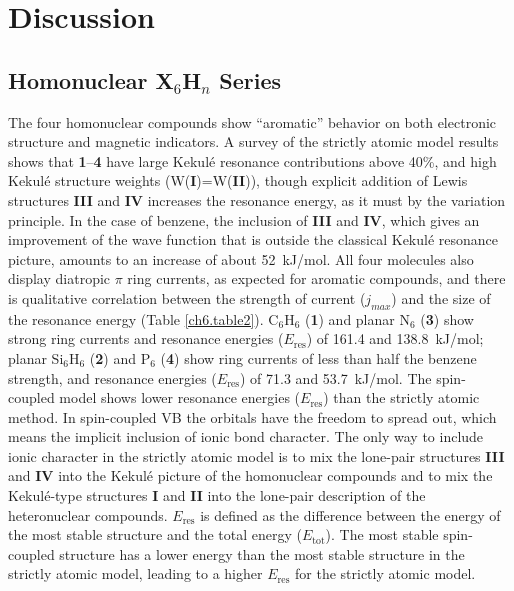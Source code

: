 \section{Discussion}

\subsection{Homonuclear X$_6$H$_n$ Series}

The four homonuclear compounds show ``aromatic'' behavior on both electronic
structure and magnetic indicators. A survey of the strictly atomic model results shows
that \textbf{1}--\textbf{4} have large Kekul\'e resonance contributions above
40\%, and high Kekul\'e structure weights (W(\textbf{I})=W(\textbf{II})), though explicit addition
of Lewis structures \textbf{III} and \textbf{IV} increases the resonance energy,
as it must by the variation principle. In the case of benzene, the inclusion of
\textbf{III} and \textbf{IV}, which gives an improvement of the wave function that is outside the
classical Kekul\'e resonance picture, amounts to an increase of about 52~kJ/mol.
All four molecules also display diatropic $\pi$ ring currents, as expected for aromatic
compounds, and there is qualitative correlation between the strength of current ($j_{max}$)
and the size of the resonance energy (Table \ref{ch6.table2}). C$_6$H$_6$ (\textbf{1}) and
planar N$_6$ (\textbf{3}) show strong ring currents and resonance energies ($E_\mathrm{res}$)
of 161.4 and 138.8~kJ/mol; planar Si$_6$H$_6$ (\textbf{2}) and P$_6$ (\textbf{4}) show ring currents
of less than half the benzene strength, and resonance energies ($E_\mathrm{res}$) of
 71.3 and 53.7~kJ/mol. The spin-coupled model shows lower resonance energies ($E_\mathrm{res}$)
than the strictly atomic method. In spin-coupled VB the orbitals have the freedom to spread out,
which means the implicit inclusion of ionic bond character. The only way to include ionic
character in the strictly atomic model is to mix the lone-pair structures \textbf{III}
and \textbf{IV} into the Kekul\'e picture of the homonuclear compounds and to mix the
Kekul\'e-type structures \textbf{I} and \textbf{II} into the lone-pair description of the
heteronuclear compounds. $E_\mathrm{res}$ is defined as the difference between the energy of the most stable structure and the total energy ($E_\mathrm{tot}$). The most stable spin-coupled structure
has a lower energy than the most stable structure in the strictly atomic model, leading to
a higher $E_\mathrm{res}$ for the strictly atomic model.

